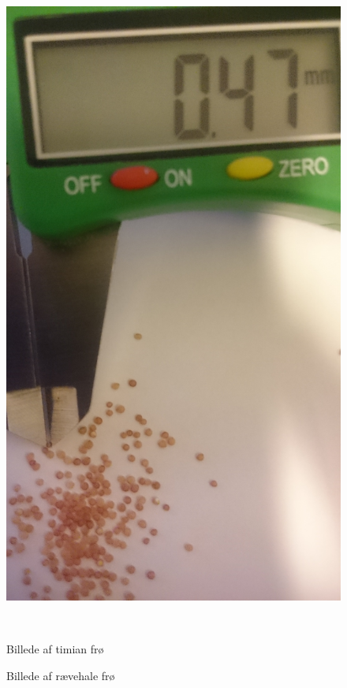 \begin{figure}[htbp]
\begin{minipage}[b]{0.48\textwidth}
\end{minipage} \hfill
\begin{minipage}[b]{0.48\textwidth} \centering
\includegraphics[width=1.00\textwidth]{billeder/Hovedrapport/foxtail.jpg} %
\end{minipage} \\ %
\begin{minipage}[b]{0.48\textwidth}
\caption{Billede af timian frø} %
\label{fig:timian}
\end{minipage} \hfill
\begin{minipage}[b]{0.48\textwidth}
\caption{Billede af rævehale frø} %
\label{fig:foxtail}
\end{minipage}
\end{figure}

